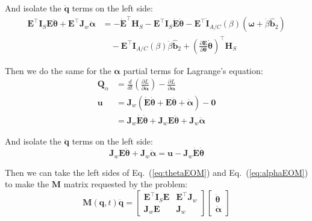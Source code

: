 \documentclass[titlepage]{article}
\begin{document}
And isolate the $\ddot{\boldsymbol{q}}$ terms on the left side:
\begin{equation}
	\begin{split}
		\boldsymbol{E}^\top\boldsymbol{I}_S\boldsymbol{E}\ddot{\boldsymbol{\theta}}+\boldsymbol{E}^\top\boldsymbol{J}_w\ddot{\boldsymbol{\alpha}}&=-\dot{\boldsymbol{E}}^\top\boldsymbol{H}_S-\boldsymbol{E}^\top\boldsymbol{I}_S\dot{\boldsymbol{E}}\dot{\boldsymbol{\theta}}-\boldsymbol{E}^\top\dot{\boldsymbol{I}}_{A/C}(\beta)\left(\boldsymbol{\omega}+\dot{\beta}\hat{\boldsymbol{b}}_2\right) \\
		&\quad-\boldsymbol{E}^\top\boldsymbol{I}_{A/C}(\beta)\ddot{\beta}\hat{\boldsymbol{b}}_2+\left(\frac{\partial\boldsymbol{E}}{\partial\boldsymbol{\theta}}\dot{\boldsymbol{\theta}}\right)^\top\boldsymbol{H}_S
	\end{split}
	\label{eq:thetaEOM}
\end{equation}

Then we do the same for the $\boldsymbol{\alpha}$ partial terms for Lagrange's equation:
\begin{equation}
	\begin{split}
		\boldsymbol{Q}_\alpha&=\frac{d}{dt}\left(\frac{\partial L}{\partial\dot{\boldsymbol{\alpha}}}\right)-\frac{\partial L}{\partial\boldsymbol{\alpha}} \\
		\boldsymbol{u}&=\boldsymbol{J}_w\left(\dot{\boldsymbol{E}}\dot{\boldsymbol{\theta}}+\boldsymbol{E}\ddot{\boldsymbol{\theta}}+\ddot{\boldsymbol{\alpha}}\right)-\boldsymbol{0} \\
		&=\boldsymbol{J}_w\dot{\boldsymbol{E}}\dot{\boldsymbol{\theta}}+\boldsymbol{J}_w\boldsymbol{E}\ddot{\boldsymbol{\theta}}+\boldsymbol{J}_w\ddot{\boldsymbol{\alpha}}
	\end{split}
\end{equation}

And isolate the $\ddot{\boldsymbol{q}}$ terms on the left side:
\begin{equation}
	\boldsymbol{J}_w\boldsymbol{E}\ddot{\boldsymbol{\theta}}+\boldsymbol{J}_w\ddot{\boldsymbol{\alpha}}=\boldsymbol{u}-\boldsymbol{J}_w\dot{\boldsymbol{E}}\dot{\boldsymbol{\theta}}
	\label{eq:alphaEOM}
\end{equation}

Then we can take the left sides of Eq.~(\ref{eq:thetaEOM}) and Eq.~(\ref{eq:alphaEOM}) to make the $\boldsymbol{M}$ matrix requested by the problem:
\begin{equation}
	\boldsymbol{M}(\boldsymbol{q},t)\ddot{\boldsymbol{q}}=
	\begin{bmatrix}
		\boldsymbol{E}^\top\boldsymbol{I}_S\boldsymbol{E} & \boldsymbol{E}^\top\boldsymbol{J}_w \\
		\boldsymbol{J}_w\boldsymbol{E} & \boldsymbol{J}_w
	\end{bmatrix}
	\begin{bmatrix}
		\ddot{\boldsymbol{\theta}} \\
		\ddot{\boldsymbol{\alpha}}
	\end{bmatrix}
	\label{eq:M}
\end{equation}
\end{document}
